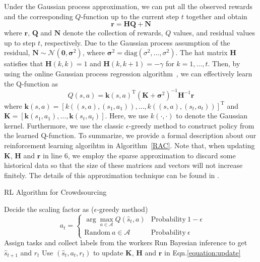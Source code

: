 Under the Gaussian process approximation, we can put all the observed rewards and the corresponding $Q$-function up to the current step $t$ together and obtain
\begin{equation}
\bm{r}=\bm{H}\bm{Q}+\bm{N}
\end{equation}
where $\bm{r}$, $\bm{Q}$ and $\bm{N}$ denote the collection of rewards, $Q$ values, and residual values up to step $t$, respectively.
Due to the Gaussian process assumption of the residual, $\bm{N}\sim \mathcal{N}(\bm{0},\bm{\sigma}^2)$, where $\bm{\sigma}^2=\textrm{diag}(\sigma^2,\ldots,\sigma^2)$.
The hat matrix $\bm{H}$ satisfies that $\bm{H}(k,k)=1$ and $\bm{H}(k,k+1)=-\gamma$ for $k=1,\ldots, t$.
Then, by using the online Gaussian process regression algorithm~\cite{engel2005reinforcement}, we can effectively learn the Q-function as
\begin{equation}
\label{equation:update}
Q(s,a) = \bm{k}(s,a) ^{\mathrm{T}}(\bm{K} +\bm{\sigma}^2)^{-1}\bm{H}^{-1}\bm{r}
\end{equation}
where $\bm{k}(s,a)=[k((s,a), (s_1,a_1)),\ldots, k((s,a), (s_t,a_t))]^{\mathrm{T}}$ and $\bm{K}=[\bm{k}(s_1,a_1),\ldots,\bm{k}(s_t,a_t)]$. Here, we use $k(\cdot, \cdot)$ to denote the Gaussian kernel.
Furthermore, we use the classic $\epsilon$-greedy method to construct policy from the learned Q-function.
To summarize, we provide a formal description about our reinforcement learning algorihtm in Algorithm~\ref{RAC}.
Note that, when updating $\bm{K}$, $\bm{H}$ and $\bm{r}$ in line 6, we employ the sparse approximation to discard some historical data so that the size of these matrices and vectors will not increase finitely. The details of this approximation technique can be found in \cite{gasic2014gaussian}.

\begin{algorithm}[tb]
   \caption{RL Algorithm for Crowdsourcing}
   \label{RAC}
   \small
\begin{algorithmic}[1]
   \STATE Decide the scaling factor as ($\epsilon$-greedy method)
			$$\ \ a_t=\left\{
			\begin{array}{ll}
				\arg\max_{a\in\mathcal{A}}Q(\hat{s}_t,a) & \mathrm{Probability\ } 1-\epsilon\\
				\mathrm{Random\ } a\in\mathcal{A} & \mathrm{Probability\ } \epsilon
			\end{array}						
			 \right.$$   
   \STATE Assign tasks and collect labels from the workers
   \STATE Run Bayesian inference to get $\hat{s}_{t+1}$ and $r_t$
   \STATE Use $(\hat{s}_t, a_t, r_t)$ to update $\bm{K}$, $\bm{H}$ and $\bm{r}$ in Eqn.\ref{equation:update}
   \ENDFOR
   \ENDFOR
\end{algorithmic}
\end{algorithm}